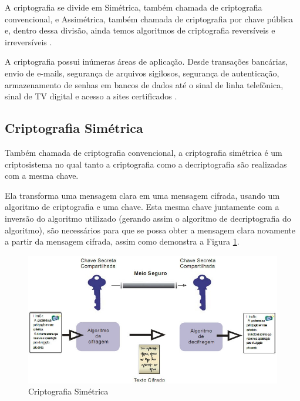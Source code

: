 
A criptografia se divide em Simétrica, também chamada de criptografia convencional, e Assimétrica, também chamada de criptografia por chave pública \cite{stallings14} \cite{tanenbaum03} e, dentro dessa divisão, ainda temos algoritmos de criptografia reversíveis e irreversíveis \cite{stallings14} \cite{itu91}.

A criptografia possui inúmeras áreas de aplicação. Desde transações bancárias, envio de e-mails, segurança de arquivos sigilosos, segurança de autenticação, armazenamento de senhas em bancos de dados até o sinal de linha telefônica, sinal de TV digital e acesso a sites certificados \cite{avelino07}.

\subsection{Criptografia Simétrica}
\label{subsec:criptografiasync}
Também chamada de criptografia convencional, a criptografia simétrica é um criptosistema no qual tanto a criptografia como a decriptografia são realizadas com a mesma chave.

Ela transforma uma mensagem clara em uma mensagem cifrada, usando um algoritmo de criptografia e uma chave. Esta mesma chave juntamente com a inversão do algoritmo utilizado (gerando assim o algoritmo de decriptografia do algoritmo), são necessários para que se possa obter a mensagem clara novamente a partir da mensagem cifrada, assim como demonstra a Figura \ref{fig:cripsimerica}.

\begin{figure}[H]
    \centering
    \caption{Criptografia Simétrica}
    \label{fig:cripsimerica}
    \includegraphics[width=.8\linewidth]{Figuras/CripSimetrica.jpg}
\end{figure}

